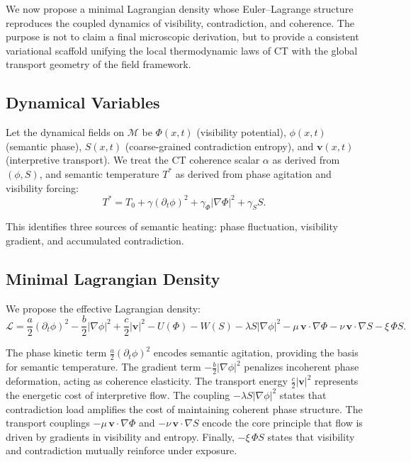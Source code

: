 \documentclass[12pt,a4paper]{article}
\begin{document}
We now propose a minimal Lagrangian density whose Euler--Lagrange structure reproduces the coupled dynamics of visibility, contradiction, and coherence. The purpose is not to claim a final microscopic derivation, but to provide a consistent variational scaffold unifying the local thermodynamic laws of CT with the global transport geometry of the field framework.

\subsection{Dynamical Variables}

Let the dynamical fields on $\mathcal{M}$ be $\Phi(x,t)$ (visibility potential), $\phi(x,t)$ (semantic phase), $S(x,t)$ (coarse-grained contradiction entropy), and $\mathbf{v}(x,t)$ (interpretive transport). We treat the CT coherence scalar $\alpha$ as derived from $(\phi, S)$, and semantic temperature $T^*$ as derived from phase agitation and visibility forcing:
\[
T^* = T_0 + \gamma(\partial_t \phi)^2 + \gamma_\Phi |\nabla \Phi|^2 + \gamma_S S.
\]

This identifies three sources of semantic heating: phase fluctuation, visibility gradient, and accumulated contradiction.

\subsection{Minimal Lagrangian Density}

We propose the effective Lagrangian density:
\[
\mathcal{L}
=
\frac{a}{2}(\partial_t \phi)^2
-
\frac{b}{2}|\nabla \phi|^2
+
\frac{c}{2}|\mathbf{v}|^2
-
U(\Phi)
-
W(S)
-
\lambda S |\nabla \phi|^2
-
\mu \,\mathbf{v}\cdot \nabla \Phi
-
\nu \,\mathbf{v}\cdot \nabla S
-
\xi \,\Phi S.
\]

The phase kinetic term $\frac{a}{2}(\partial_t \phi)^2$ encodes semantic agitation, providing the basis for semantic temperature. The gradient term $-\frac{b}{2}|\nabla \phi|^2$ penalizes incoherent phase deformation, acting as coherence elasticity. The transport energy $\frac{c}{2}|\mathbf{v}|^2$ represents the energetic cost of interpretive flow. The coupling $-\lambda S|\nabla \phi|^2$ states that contradiction load amplifies the cost of maintaining coherent phase structure. The transport couplings $-\mu\,\mathbf{v}\cdot\nabla\Phi$ and $-\nu\,\mathbf{v}\cdot\nabla S$ encode the core principle that flow is driven by gradients in visibility and entropy. Finally, $-\xi\,\Phi S$ states that visibility and contradiction mutually reinforce under exposure.
\end{document}
